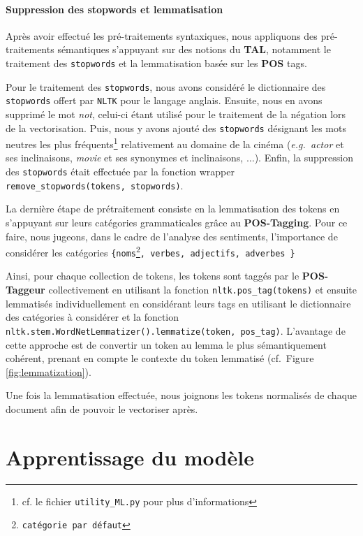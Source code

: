\documentclass[12pt,a4paper]{report}
\theoremstyle{definition}
\begin{document}
\subsubsection{Suppression des stopwords et lemmatisation}
Après avoir effectué les pré-traitements syntaxiques, nous appliquons des pré-traitements sémantiques s'appuyant sur des notions du \textbf{TAL}, notamment le traitement des \texttt{stopwords} et la lemmatisation basée sur les \textbf{POS} tags.

Pour le traitement des \texttt{stopwords}, nous avons considéré le dictionnaire des \texttt{stopwords} offert par \texttt{NLTK} pour le langage anglais. Ensuite, nous en avons supprimé le mot \og \textit{not}, celui-ci étant utilisé pour le traitement de la négation lors de la vectorisation. Puis, nous y avons ajouté des \texttt{stopwords} désignant les mots neutres les plus fréquents\footnote{cf. le fichier \texttt{utility\_ML.py} pour plus d'informations} relativement au domaine de la cinéma (\emph{e.g.~actor} et ses inclinaisons, \emph{movie} et ses synonymes et inclinaisons, $\dots$). Enfin, la suppression des \texttt{stopwords} était effectuée par la fonction wrapper \texttt{remove\_stopwords(tokens, stopwords)}.

La dernière étape de prétraitement consiste en la lemmatisation des tokens en s'appuyant sur leurs catégories grammaticales grâce au \textbf{POS-Tagging}. Pour ce faire, nous jugeons, dans le cadre de l'analyse des sentiments, l'importance de considérer les catégories \texttt{\{noms\footnote{catégorie par défaut}, verbes, adjectifs, adverbes \}}

Ainsi, pour chaque collection de tokens, les tokens sont taggés par le \textbf{POS-Taggeur} collectivement en utilisant la fonction \texttt{nltk.pos\_tag(tokens)} et ensuite lemmatisés individuellement en considérant leurs tags en utilisant le dictionnaire des catégories à considérer et la fonction \texttt{nltk.stem.WordNetLemmatizer().lemmatize(token, pos\_tag)}. L'avantage de cette approche est de convertir un token au lemma le plus sémantiquement cohérent, prenant en compte le contexte du token lemmatisé (cf.~Figure \ref{fig:lemmatization}).

Une fois la lemmatisation effectuée, nous joignons les tokens normalisés de chaque document afin de pouvoir le vectoriser après.

\chapter{Apprentissage du modèle}
\end{document}
